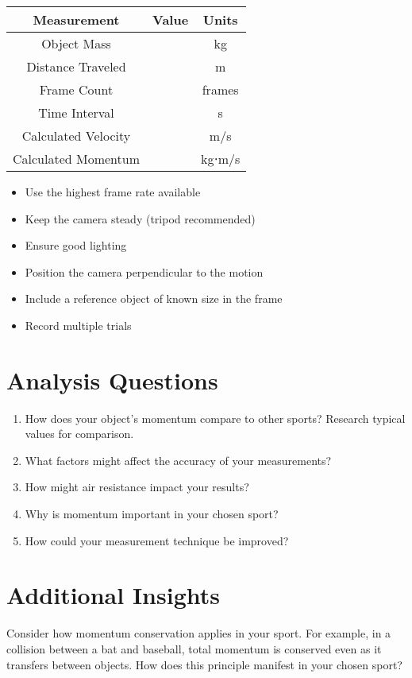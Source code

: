 \documentclass[12pt]{article}
\begin{document}
\begin{table}[H]
\centering
\begin{tabular}{ccc}
\toprule
Measurement & Value & Units \\
\midrule
Object Mass & & kg \\
Distance Traveled & & m \\
Frame Count & & frames \\
Time Interval & & s \\
Calculated Velocity & & m/s \\
Calculated Momentum & & kg⋅m/s \\
\bottomrule
\end{tabular}
\end{table}

\begin{tcolorbox}[colback=conceptgreen!10,colframe=conceptgreen,title=\textbf{Video Recording Best Practices}]
\begin{itemize}
\item Use the highest frame rate available
\item Keep the camera steady (tripod recommended)
\item Ensure good lighting
\item Position the camera perpendicular to the motion
\item Include a reference object of known size in the frame
\item Record multiple trials
\end{itemize}
\end{tcolorbox}

\section*{Analysis Questions}
\begin{enumerate}[label=\arabic*.]
\item How does your object's momentum compare to other sports? Research typical values for comparison.
\item What factors might affect the accuracy of your measurements?
\item How might air resistance impact your results?
\item Why is momentum important in your chosen sport?
\item How could your measurement technique be improved?
\end{enumerate}

\section*{Additional Insights}
Consider how momentum conservation applies in your sport. For example, in a collision between a bat and baseball, total momentum is conserved even as it transfers between objects. How does this principle manifest in your chosen sport?
\end{document}
